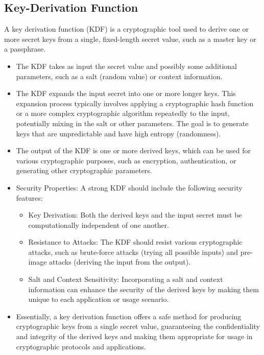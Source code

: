 \documentclass[10pt,oneside,english,a4paper]{article}
\begin{document}
\subsection{Key-Derivation Function}
A key derivation function (KDF) is a cryptographic tool used to derive one or more secret keys from a single, fixed-length secret value, such as a master key or a passphrase.
\begin{itemize}
\item The KDF takes as input the secret value and possibly some additional parameters, such as a salt (random value) or context information.
\item The KDF expands the input secret into one or more longer keys. This expansion process typically involves applying a cryptographic hash function or a more complex cryptographic algorithm repeatedly to the input, potentially mixing in the salt or other parameters. The goal is to generate keys that are unpredictable and have high entropy (randomness).
\item The output of the KDF is one or more derived keys, which can be used for various cryptographic purposes, such as encryption, authentication, or generating other cryptographic parameters.

\item Security Properties: A strong KDF should include the following security features:
	\begin{itemize}        
		\item Key Derivation: Both the derived keys and the input secret must be computationally independent of one another.
	        \item Resistance to Attacks: The KDF should resist various cryptographic attacks, such as brute-force attacks (trying all possible inputs) and pre-image attacks (deriving the input from the output).
	        \item Salt and Context Sensitivity: Incorporating a salt and context information can enhance the security of the derived keys by making them unique to each application or usage scenario.
	\end{itemize}

\item Essentially, a key derivation function offers a safe method for producing cryptographic keys from a single secret value, guaranteeing the confidentiality and integrity of the derived keys and making them appropriate for usage in cryptographic protocols and applications.
\end{itemize}
\end{document}

